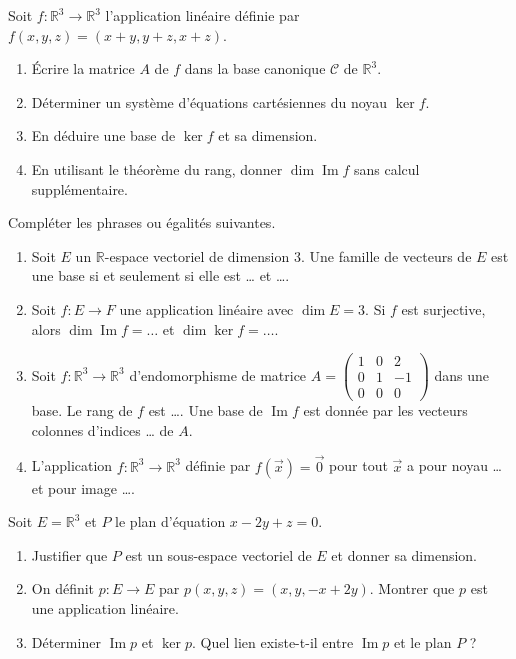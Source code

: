 \documentclass[11pt]{article}
\begin{document}
\begin{exercice}
Soit $f : \mathbb{R}^3 \to \mathbb{R}^3$ l'application linéaire définie par $f(x,y,z) = (x+y, y+z, x+z)$.
\begin{enumerate}
    \item Écrire la matrice $A$ de $f$ dans la base canonique $\mathcal{C}$ de $\mathbb{R}^3$.
    \item Déterminer un système d'équations cartésiennes du noyau $\ker f$.
    \item En déduire une base de $\ker f$ et sa dimension.
    \item En utilisant le théorème du rang, donner $\dim \operatorname{Im} f$ sans calcul supplémentaire.
\end{enumerate}
\end{exercice}

\begin{exercice}
Compléter les phrases ou égalités suivantes.
\begin{enumerate}
    \item Soit $E$ un $\mathbb{R}$-espace vectoriel de dimension 3. Une famille de vecteurs de $E$ est une base si et seulement si elle est \ldots{} et \ldots{}.
    \item Soit $f : E \to F$ une application linéaire avec $\dim E = 3$. Si $f$ est surjective, alors $\dim \operatorname{Im} f = \ldots{}$ et $\dim \ker f = \ldots{}$.
    \item Soit $f : \mathbb{R}^3 \to \mathbb{R}^3$ d'endomorphisme de matrice $A = \begin{pmatrix} 1 & 0 & 2 \\ 0 & 1 & -1 \\ 0 & 0 & 0 \end{pmatrix}$ dans une base. Le rang de $f$ est \ldots{}. Une base de $\operatorname{Im} f$ est donnée par les vecteurs colonnes d'indices \ldots{} de $A$.
    \item L'application $f : \mathbb{R}^3 \to \mathbb{R}^3$ définie par $f(\vec{x}) = \vec{0}$ pour tout $\vec{x}$ a pour noyau \ldots{} et pour image \ldots{}.
\end{enumerate}
\end{exercice}

\begin{exercice}
Soit $E = \mathbb{R}^3$ et $P$ le plan d'équation $x - 2y + z = 0$.
\begin{enumerate}
    \item Justifier que $P$ est un sous-espace vectoriel de $E$ et donner sa dimension.
    \item On définit $p : E \to E$ par $p(x,y,z) = (x, y, -x+2y)$. Montrer que $p$ est une application linéaire.
    \item Déterminer $\operatorname{Im} p$ et $\ker p$. Quel lien existe-t-il entre $\operatorname{Im} p$ et le plan $P$ ?
\end{enumerate}
\end{exercice}
\end{document}
